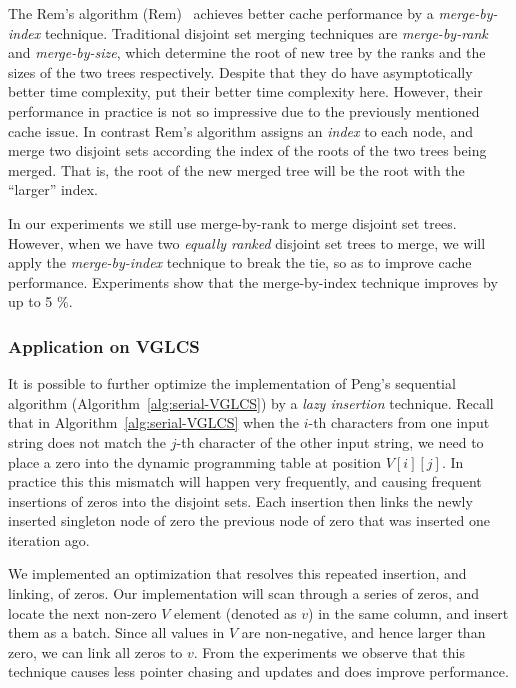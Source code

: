 
The Rem's algorithm ({\sc Rem})~\cite{dijkstra1976a} achieves better
cache performance by a {\em merge-by-index} technique.  Traditional
disjoint set merging techniques are {\em merge-by-rank}\cite{XXX} and
{\em merge-by-size}\cite{XXX}, which determine the root of new tree by
the ranks and the sizes of the two trees respectively.  Despite that
they do have asymptotically better time complexity, put their better
time complexity here.  However, their performance in practice is not
so impressive due to the previously mentioned cache issue.  In
contrast Rem's algorithm assigns an {\em index} to each node, and
merge two disjoint sets according the index of the roots of the two
trees being merged.  That is, the root of the new merged tree will be
the root with the ``larger'' index.

In our experiments we still use merge-by-rank to merge disjoint set
trees.  However, when we have two {\em equally ranked} disjoint set
trees to merge, we will apply the {\em merge-by-index} technique to
break the tie, so as to improve cache performance.  Experiments show
that the merge-by-index technique improves by up to 5 \%.

\subsubsection{Application on VGLCS}


It is possible to further optimize the implementation of Peng's
sequential algorithm (Algorithm~\ref{alg:serial-VGLCS}) by a {\em lazy
  insertion} technique.  Recall that in
Algorithm~\ref{alg:serial-VGLCS} when the $i$-th characters from one
input string does not match the $j$-th character of the other input
string, we need to place a zero into the dynamic programming table at
position $V[i][j]$.  In practice this this mismatch will happen very
frequently, and causing frequent insertions of zeros into the disjoint
sets.  Each insertion then links the newly inserted singleton node of
zero the previous node of zero that was inserted one iteration ago. 

We implemented an optimization that resolves this repeated insertion,
and linking, of zeros.  Our implementation will scan through a series
of zeros, and locate the next non-zero $V$ element (denoted as $v$) in
the same column, and insert them as a batch.  Since all values in $V$
are non-negative, and hence larger than zero, we can link all zeros to
$v$.  From the experiments we observe that this technique causes less
pointer chasing and updates and does improve performance.

